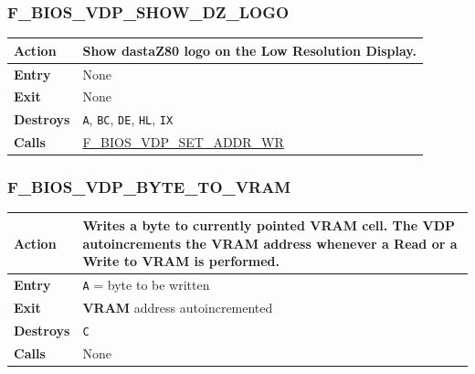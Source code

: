 \documentclass[a4paper,11pt]{article}
\begin{document}
        \subsubsection{F\_BIOS\_VDP\_SHOW\_DZ\_LOGO}
        \label{func:fbiosvdpshowdzlogo}
        \begin{tabular}{l p{9cm}}
            \hline\textbf{Action}
            & Show dastaZ80 logo on the \textbf{Low Resolution Display}.\\
            \hline\textbf{Entry} & None\\
            \hline\textbf{Exit} & None\\
            \hline\textbf{Destroys} & \texttt{A}, \texttt{BC}, \texttt{DE},
            \texttt{HL}, \texttt{IX} \\
            \hline\textbf{Calls} & \hyperref[func:fbiosvdpsetaddrwr]
            {F\_BIOS\_VDP\_SET\_ADDR\_WR}\\
            \hline
        \end{tabular}

        \subsubsection{F\_BIOS\_VDP\_BYTE\_TO\_VRAM}
        \label{func:fbiosvdpbytetovram}
        \begin{tabular}{l p{9cm}}
            \hline\textbf{Action}
            & Writes a byte to currently pointed \textbf{VRAM} cell. The 
            \textbf{VDP} autoincrements the \textbf{VRAM} address whenever a
            Read or a Write to \textbf{VRAM} is performed.\\
            \hline\textbf{Entry} & \texttt{A} = byte to be written\\
            \hline\textbf{Exit} & \textbf{VRAM} address autoincremented\\
            \hline\textbf{Destroys} & \texttt{C} \\
            \hline\textbf{Calls} & None\\
            \hline
        \end{tabular}

\end{document}
